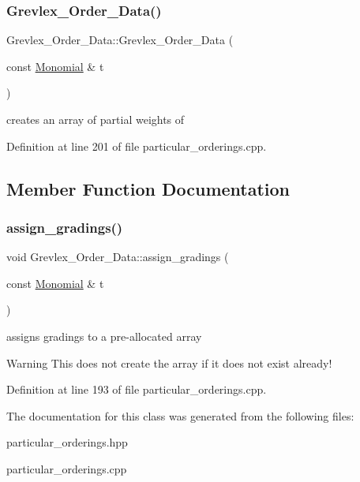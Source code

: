 \subsubsection{\texorpdfstring{Grevlex\+\_\+\+Order\+\_\+\+Data()}{Grevlex\_Order\_Data()}}
{\footnotesize\ttfamily Grevlex\+\_\+\+Order\+\_\+\+Data\+::\+Grevlex\+\_\+\+Order\+\_\+\+Data (\begin{DoxyParamCaption}\item[{const \hyperlink{class_monomial}{Monomial} \&}]{t }\end{DoxyParamCaption})}

creates an array of partial weights of {\ttfamily } 

Definition at line 201 of file particular\+\_\+orderings.\+cpp.



\subsection{Member Function Documentation}
\mbox{\label{class_grevlex___order___data_aeaf81375ec0b27a6e9c047b1d63c6d55}} 
\subsubsection{\texorpdfstring{assign\+\_\+gradings()}{assign\_gradings()}}
{\footnotesize\ttfamily void Grevlex\+\_\+\+Order\+\_\+\+Data\+::assign\+\_\+gradings (\begin{DoxyParamCaption}\item[{const \hyperlink{class_monomial}{Monomial} \&}]{t }\end{DoxyParamCaption})}



assigns gradings to a pre-\/allocated array 

\begin{DoxyWarning}{Warning}
This does not create the array if it does not exist already! 
\end{DoxyWarning}


Definition at line 193 of file particular\+\_\+orderings.\+cpp.



The documentation for this class was generated from the following files\+:\begin{DoxyCompactItemize}
\item 
particular\+\_\+orderings.\+hpp\item 
particular\+\_\+orderings.\+cpp\end{DoxyCompactItemize}
